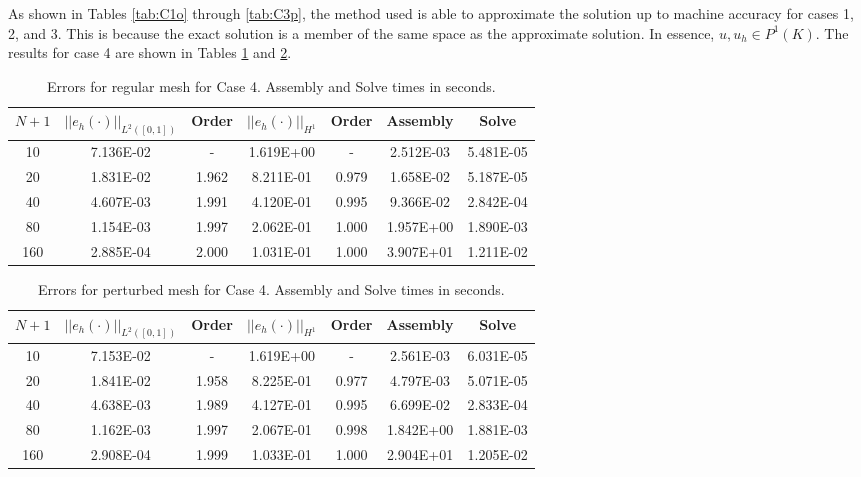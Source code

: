 \documentclass[a4paper, 12pt]{article}
\begin{document}
As shown in Tables \ref{tab:C1o} through \ref{tab:C3p}, 
the method used is able to approximate the solution
up to machine accuracy for cases 1, 2, and 3. 
This is because the exact solution is a member 
of the same space as the approximate solution.
In essence, $u, u_h \in P^1(K)$.
The results for case 4 are shown in Tables \ref{tab:C4o}
and \ref{tab:C4p}. 

\begin{table}[!ht]
\caption{Errors for regular mesh for Case 4. Assembly and Solve times in seconds.}
\vspace{0.1in}
\centering
\begin{tabular}{|c|c|c|c|c|c|c|}
\hline
 $N+1$&  $||e_h(\cdot)||_{L^2([0,1])}$ & Order & $||e_h(\cdot)||_{H^1}$ & Order & Assembly & Solve \\
 \hline
     10   & 7.136E-02 &  -      & 1.619E+00 &  -     & 2.512E-03 & 5.481E-05 \\
     20   & 1.831E-02 &  1.962  & 8.211E-01 &  0.979 & 1.658E-02 & 5.187E-05 \\
     40   & 4.607E-03 &  1.991  & 4.120E-01 &  0.995 & 9.366E-02 & 2.842E-04 \\
     80   & 1.154E-03 &  1.997  & 2.062E-01 &  1.000 & 1.957E+00 & 1.890E-03 \\
     160  & 2.885E-04 &  2.000  & 1.031E-01 &  1.000 & 3.907E+01 & 1.211E-02 \\
\hline
\end{tabular}
\label{tab:C4o}
\end{table}

\begin{table}[!ht]
\caption{Errors for perturbed mesh for Case 4. Assembly and Solve times in seconds.}
\vspace{0.1in}
\centering
\begin{tabular}{|c|c|c|c|c|c|c|}
\hline
 $N+1$&  $||e_h(\cdot)||_{L^2([0,1])}$ & Order & $||e_h(\cdot)||_{H^1}$ & Order & Assembly & Solve \\
 \hline
     10   & 7.153E-02 & -     & 1.619E+00 &  -     & 2.561E-03 & 6.031E-05 \\
     20   & 1.841E-02 & 1.958 & 8.225E-01 &  0.977 & 4.797E-03 & 5.071E-05 \\
     40   & 4.638E-03 & 1.989 & 4.127E-01 &  0.995 & 6.699E-02 & 2.833E-04 \\
     80   & 1.162E-03 & 1.997 & 2.067E-01 &  0.998 & 1.842E+00 & 1.881E-03 \\
     160  & 2.908E-04 & 1.999 & 1.033E-01 &  1.000 & 2.904E+01 & 1.205E-02 \\
\hline
\end{tabular}
\label{tab:C4p}
\end{table}
\end{document}
